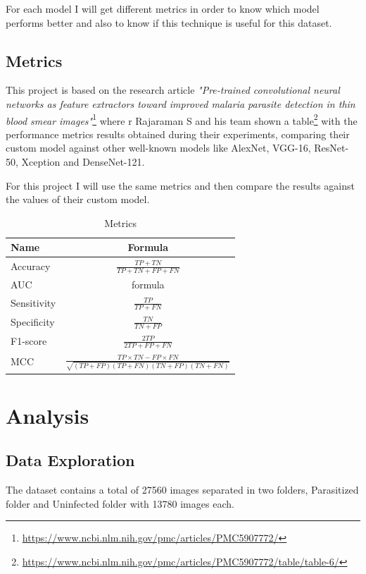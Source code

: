 \documentclass{article}
\begin{document}
	\medskip
	For each model I will get different metrics in order to know which model performs better and also to know if this technique is useful for this dataset.
	
	\subsection{Metrics}
	This project is based on the research article \textit{"Pre-trained convolutional neural networks as feature extractors toward improved malaria parasite detection in thin blood smear images"}\footnote{\label{research_paper}\url{https://www.ncbi.nlm.nih.gov/pmc/articles/PMC5907772/}} where r Rajaraman S and his
	team shown a table\footnote{\label{table_metrics}\url{https://www.ncbi.nlm.nih.gov/pmc/articles/PMC5907772/table/table-6/}} with the performance metrics results obtained during their experiments,
	comparing their custom model against other well-known models like AlexNet, VGG-16,
	ResNet-50, Xception and DenseNet-121.
	
	\medskip
	For this project I will use the same metrics and then compare the results against the values of
	their custom model.		
	
	\begin{table}[h!]
		\begin{center}
			\caption{Metrics}
			{\renewcommand{\arraystretch}{2}%
			\begin{tabular}{l|c}
				\textbf{Name} & \textbf{Formula} \\
				\hline
				Accuracy & $ \frac{TP + TN}{TP + TN + FP + FN} $ \\
				AUC & formula \\
				Sensitivity & $ \frac{TP}{TP + FN} $ \\
				Specificity & $ \frac{TN}{TN + FP} $ \\
				F1-score & $ \frac{2TP}{2TP + FP + FN} $ \\
				MCC & $ \frac{TP \times TN - FP \times FN}{\sqrt{(TP + FP)(TP + FN)(TN + FP)(TN + FN)}} $ \\
			\end{tabular}} \quad
		\end{center}
	\end{table}

\newpage

	\section{Analysis}
	\subsection{Data Exploration}	
	The dataset contains a total of 27560 images separated in two folders, Parasitized folder and
	Uninfected folder with 13780 images each.
	
\end{document}
